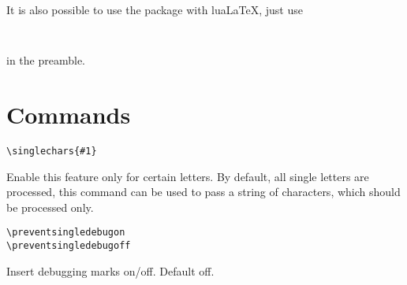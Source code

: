 \documentclass{ltxdoc}
\begin{document}
\bigskip
It is also possible to use the package with lua\LaTeX, just use

\begin{verbatim}
	
\end{verbatim}

in the preamble.

\section{Commands}

\begin{verbatim}
\singlechars{#1} 
\end{verbatim}

Enable this feature only for certain letters. By default, all
single letters are processed, this command can be used to pass a
string of characters, which should be processed only.

\begin{verbatim}
\preventsingledebugon
\preventsingledebugoff
\end{verbatim}

Insert debugging marks on/off. Default off.
\end{document}
